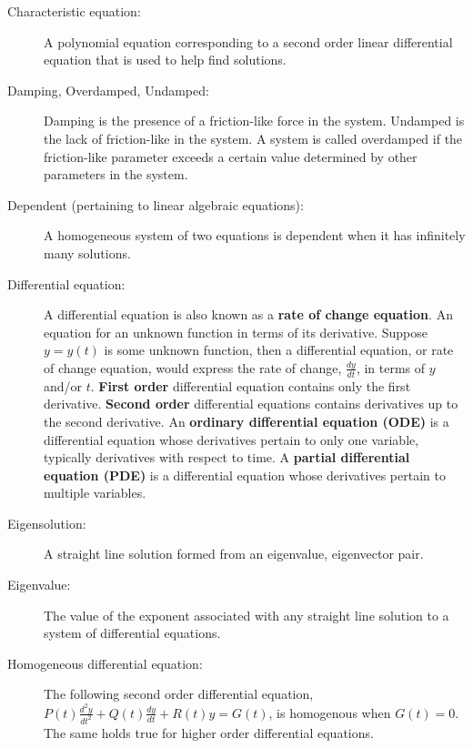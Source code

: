 \pagestyle{fancy}
\setcounter{page}{1}
\lfoot{}
\cfoot{}
\renewcommand{\footrulewidth}{.4pt}
\vspace*{-20pt} \thispagestyle{firstfooter}
\begin{description}
\item[Characteristic equation:] A polynomial equation corresponding to a second order linear differential equation that is used to help find solutions.  
\item[Damping, Overdamped, Undamped:] Damping is the presence of a friction-like force in the system. Undamped is the lack of friction-like in the system. A system is called overdamped if the friction-like parameter exceeds a certain value determined by other parameters in the system.  
\item[Dependent (pertaining to linear algebraic equations):] A homogeneous system of two equations is dependent when it has infinitely many solutions.
\item[Differential equation:] A differential equation is also known as a \textbf{rate of change equation}. An equation for an unknown function in terms of its derivative. Suppose $y = y(t)$ is some unknown function, then a differential equation, or rate of change equation, would express the rate of change, $\frac{dy}{dt}$, in terms of $y$ and/or $t$. \textbf{First order} differential equation contains only the first derivative. \textbf{Second order} differential equations contains derivatives up to the second derivative. An \textbf{ordinary differential equation (ODE)} is a differential equation whose derivatives pertain to only one variable, typically derivatives with respect to time. A \textbf{partial differential equation (PDE)} is a differential equation whose derivatives pertain to multiple variables.
\item[Eigensolution:] A straight line solution formed from an eigenvalue, eigenvector pair.
\item[Eigenvalue:] The value of the exponent associated with any straight line solution to a system of differential equations.
\item[Homogeneous differential equation:] The following second order differential equation, $P(t)\frac{d^2y}{dt^2}+Q(t)\frac{dy}{dt}+R(t)y=G(t)$, is homogenous when $G(t)=0$. The same holds true for higher order differential equations.

\end{description}
